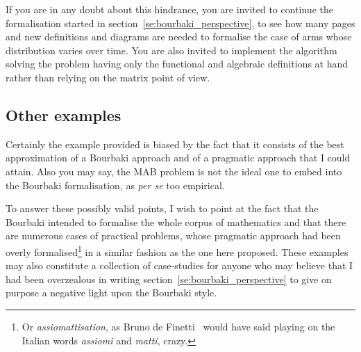 \documentclass[]{scrartcl}
\theoremstyle{definition}
\begin{document}
If you are in any doubt about this hindrance, you are invited to continue the formalisation started in section~\ref{se:bourbaki_perspective}, to see how many pages and new definitions and diagrams are needed to formalise the case of arms whose distribution varies over time. You are also invited to implement the algorithm solving the problem having only the functional and algebraic definitions at hand rather than relying on the matrix point of view.


\subsection*{Other examples}

Certainly the example provided is biased by the fact that it consists of the best approximation of a Bourbaki approach and of a pragmatic approach that I could attain. Also you may say, the MAB problem is not the ideal one to embed into the Bourbaki formalisation, as \emph{per se} too empirical.

To answer these possibly valid points, I wish to point at the fact that the Bourbaki intended to formalise the whole corpus of mathematics and that there are numerous cases of practical problems, whose pragmatic approach had been overly formalised\footnote{
    Or \emph{assiomattisation}, as Bruno de Finetti~\cite{de2008bruno} would have said playing on the Italian words \emph{assiomi} and \emph{matti}, crazy.
} in a similar fashion as the one here proposed. These examples may also constitute a collection of case-studies for anyone who may believe that I  had been overzealous in writing section~\ref{se:bourbaki_perspective} to give on purpose a negative light upon the Bourbaki style.
\end{document}
